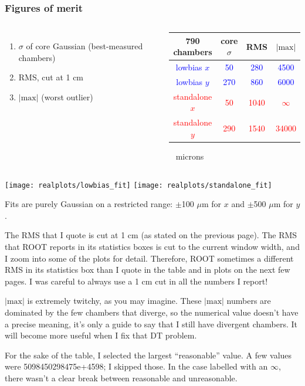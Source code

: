 \documentclass[compress]{beamer}
\begin{document}
\begin{frame}
\frametitle{Figures of merit}
\vspace{-0.75 cm}
\begin{columns}
\begin{enumerate}
\item $\sigma$ of core Gaussian (best-measured chambers)
\item RMS, cut at 1 cm
\item $|\mbox{max}|$ (worst outlier)
\end{enumerate}

\begin{center}
\begin{tabular}{c | c c c}
790 chambers & core $\sigma$ & RMS & $|\mbox{max}|$ \\\hline
\textcolor{blue}{lowbias $x$} & \textcolor{blue}{50} & \textcolor{blue}{280} & \textcolor{blue}{4500} \\
\textcolor{blue}{lowbias $y$} & \textcolor{blue}{270} & \textcolor{blue}{860} & \textcolor{blue}{6000} \\
\textcolor{red}{standalone $x$} & \textcolor{red}{50} & \textcolor{red}{1040} & \textcolor{red}{$\infty$} \\
\textcolor{red}{standalone $y$} & \textcolor{red}{290} & \textcolor{red}{1540} & \textcolor{red}{34000} \\
\end{tabular}
\mbox{ } \hfill microns
\end{center}

\end{columns}

\vfill
\texttt{[image: realplots/lowbias\_fit]}
\texttt{[image: realplots/standalone\_fit]} \\
\end{frame}

\begin{notes}
\small
\item Fits are purely Gaussian on a restricted range: $\pm$100 $\mu$m for $x$ and $\pm$500 $\mu$m for $y$.
\item The RMS that I quote is cut at 1 cm (as stated on the previous page).  The RMS that ROOT reports in its statistics boxes is cut to the current window width, and I zoom into some of the plots for detail.  Therefore, ROOT sometimes a different RMS in its statistics box than I quote in the table and in plots on the next few pages.  I was careful to always use a 1 cm cut in all the numbers I report!
\item $|\mbox{max}|$ is extremely twitchy, as you may imagine.  These $|\mbox{max}|$ numbers are dominated by the few chambers that diverge, so the numerical value doesn't have a precise meaning, it's only a guide to say that I still have divergent chambers.  It will become more useful when I fix that DT problem.
\item For the sake of the table, I selected the largest ``reasonable'' value.  A few values were 5098450298475e+4598; I skipped those.  In the case labelled with an $\infty$, there wasn't a clear break between reasonable and unreasonable.
\end{notes}
\end{document}
